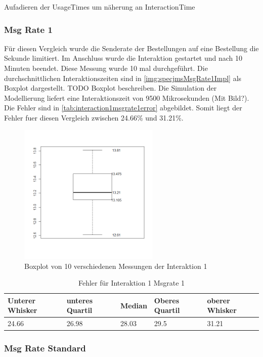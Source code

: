 Aufadieren der UsageTimes um näherung an InteractionTime

\subsubsection{Msg Rate 1}
Für diesen Vergleich wurde die Senderate der Bestellungen auf eine Bestellung die Sekunde limitiert. Im Anschluss wurde die Interaktion gestartet und nach 10 Minuten beendet. Diese Messung wurde 10 mal durchgeführt. Die durchschnittlichen Interaktionszeiten sind in \autoref{img:specjmsMsgRate1Impl} als Boxplot dargestellt. TODO Boxplot beschreiben. Die Simulation der Modellierung liefert eine Interaktionszeit von 9500 Mikrosekunden (Mit Bild?). Die Fehler sind in \autoref{tab:interaction1msgrate1error} abgebildet. Somit liegt der Fehler fuer diesen Vergleich zwischen 24.66\% und 31.21\%. 
\begin{figure}
\center
  \includegraphics[width=0.6\textwidth]{images/evaluation/specjms/interaction1msgrate1.png}
  \caption{Boxplot von 10 verschiedenen Messungen der Interaktion 1}
  \label{img:specjmsMsgRate1Impl}
\end{figure}
\begin{table}
  \begin{tabular}{|l|l|l|l|l|}
    Unterer Whisker & unteres Quartil & Median & Oberes Quartil & oberer Whisker \\
    \hline
    24.66 & 26.98 & 28.03 & 29.5 & 31.21
  \end{tabular}
	\caption{\label{tab:interaction1msgrate1error} Fehler für Interaktion 1 Msgrate 1}
\end{table}
\subsubsection{Msg Rate Standard}
